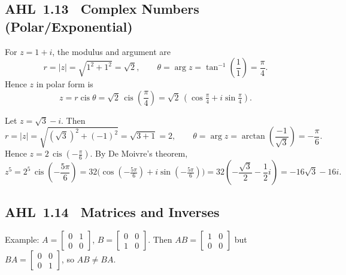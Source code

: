 \documentclass[11pt]{article}
\newcommand{\tocsubsection}[1]{\subsection{#1}}
\begin{document}
\tocsubsection{AHL 1.13 \; Complex Numbers (Polar/Exponential)}

\begin{solution}
For \(z=1+i\), the modulus and argument are
\[
r=\lvert z\rvert=\sqrt{1^{2}+1^{2}}=\sqrt{2},\qquad
\theta=\arg z=\tan^{-1}\!\left(\frac{1}{1}\right)=\frac{\pi}{4}.
\]
Hence \(z\) in polar form is
\[
z=r\operatorname{cis}\theta=\sqrt{2}\,\operatorname{cis}\!\left(\frac{\pi}{4}\right)
=\sqrt{2}\,(\cos\tfrac{\pi}{4}+i\sin\tfrac{\pi}{4}).
\]
\end{solution}

\begin{solution}
Let \(z=\sqrt{3}-i\). Then
\[
r=\lvert z\rvert=\sqrt{(\sqrt{3})^{2}+(-1)^{2}}=\sqrt{3+1}=2,
\qquad
\theta=\arg z=\arctan\!\left(\frac{-1}{\sqrt{3}}\right)=-\frac{\pi}{6}.
\]
Hence \(z=2\,\operatorname{cis}\!\left(-\frac{\pi}{6}\right)\). By De Moivre’s theorem,
\[
z^{5}=2^{5}\,\operatorname{cis}\!\left(-\frac{5\pi}{6}\right)
=32\bigl(\cos(-\tfrac{5\pi}{6})+i\sin(-\tfrac{5\pi}{6})\bigr)
=32\!\left(-\frac{\sqrt{3}}{2}-\frac{1}{2}i\right)
= -16\sqrt{3}-16i.
\]
\end{solution}

\tocsubsection{AHL 1.14 \; Matrices and Inverses}


\begin{solution}
Example: $A=\begin{bmatrix}0&1\\0&0\end{bmatrix}$, $B=\begin{bmatrix}0&0\\1&0\end{bmatrix}$.
Then $AB=\begin{bmatrix}1&0\\0&0\end{bmatrix}$ but $BA=\begin{bmatrix}0&0\\0&1\end{bmatrix}$, so $AB\ne BA$.
\end{solution}
\end{document}
